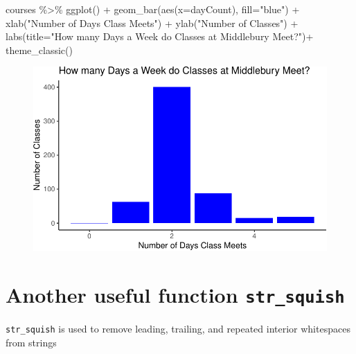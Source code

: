 \documentclass[
  letterpaper,
  DIV=11,
  numbers=noendperiod]{scrartcl}
\newenvironment{Shaded}{\begin{snugshade}}{\end{snugshade}}
\newcommand{\AttributeTok}[1]{\textcolor[rgb]{0.40,0.45,0.13}{#1}}
\newcommand{\FunctionTok}[1]{\textcolor[rgb]{0.28,0.35,0.67}{#1}}
\newcommand{\NormalTok}[1]{\textcolor[rgb]{0.00,0.23,0.31}{#1}}
\newcommand{\SpecialCharTok}[1]{\textcolor[rgb]{0.37,0.37,0.37}{#1}}
\newcommand{\StringTok}[1]{\textcolor[rgb]{0.13,0.47,0.30}{#1}}
\begin{document}
\begin{Shaded}
\begin{Highlighting}[]
\NormalTok{courses }\SpecialCharTok{\%\textgreater{}\%} 
  \FunctionTok{ggplot}\NormalTok{() }\SpecialCharTok{+} 
  \FunctionTok{geom\_bar}\NormalTok{(}\FunctionTok{aes}\NormalTok{(}\AttributeTok{x=}\NormalTok{dayCount), }\AttributeTok{fill=}\StringTok{"blue"}\NormalTok{) }\SpecialCharTok{+} 
  \FunctionTok{xlab}\NormalTok{(}\StringTok{"Number of Days Class Meets"}\NormalTok{) }\SpecialCharTok{+} 
  \FunctionTok{ylab}\NormalTok{(}\StringTok{"Number of Classes"}\NormalTok{) }\SpecialCharTok{+} 
  \FunctionTok{labs}\NormalTok{(}\AttributeTok{title=}\StringTok{"How many Days a Week do Classes at Middlebury Meet?"}\NormalTok{)}\SpecialCharTok{+}
  \FunctionTok{theme\_classic}\NormalTok{()}
\end{Highlighting}
\end{Shaded}

\begin{figure}[H]

{\centering \includegraphics{118_Q_stringr_files/figure-pdf/unnamed-chunk-14-1.pdf}

}

\end{figure}

\hypertarget{another-useful-function-str_squish}{%
\section{\texorpdfstring{Another useful function
\texttt{str\_squish}}{Another useful function str\_squish}}\label{another-useful-function-str_squish}}

\texttt{str\_squish} is used to remove leading, trailing, and repeated
interior whitespaces from strings
\end{document}
